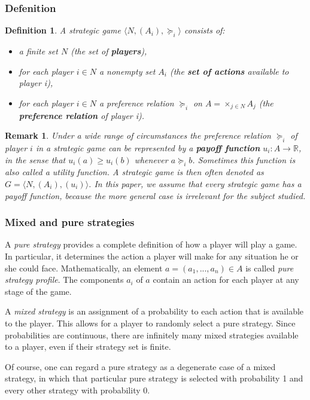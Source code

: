 \documentclass[a4paper,11pt]{article}
\newtheorem{definition}[theorem]{Definition}
\newtheorem{remark}[theorem]{Remark}
\newcommand{\R}{{\mathbb R}}
\begin{document}
\subsubsection{Defenition}
\begin{definition}\cite{2}
A strategic game $\langle N, (A_i), \succeq_i\rangle$ consists of:
\begin{itemize}
  \item a finite set $N$  (the set of \textbf{players}),
  \item for each player $i \in N$ a nonempty set $A_i$ (the \textbf{set of actions} available to player i),
  \item for each player $i \in N$ a preference relation $\succeq_i$ on $A=\times_{j\in N}A_j$ (the \textbf{preference relation} of player i).
\end{itemize}
\end{definition}
\begin{remark}
Under a wide range of circumstances the preference relation  $\succeq_i$ of player $i$ in a strategic game can be represented by a \textbf{payoff function} $u_i: A \rightarrow \R$, in the sense that $u_i(a) \geq u_i(b)$ whenever $a \succeq_i b$. Sometimes this function is also called a utility function. A strategic game is then often denoted as $G = \langle N, (A_i), (u_i)\rangle$. In this paper, we assume that every strategic game has a payoff function, because the more general case is irrelevant for the subject studied.
\end{remark}


\subsubsection{Mixed and pure strategies}
A \emph{pure strategy} provides a complete definition of how a player will play a game. In particular, it determines the action a player will make for any situation he or she could face. Mathematically, an element $a = (a_1,...,a_n) \in A$ is called \emph{pure strategy profile}. The components $a_i$ of $a$ contain an action for each player at any stage of the game.

A \emph{mixed strategy} is an assignment of a probability to each action that is available to the player. This allows for a player to randomly select a pure strategy. Since probabilities are continuous, there are infinitely many mixed strategies available to a player, even if their strategy set is finite.

Of course, one can regard a pure strategy as a degenerate case of a mixed strategy, in which that particular pure strategy is selected with probability 1 and every other strategy with probability 0.
\end{document}
